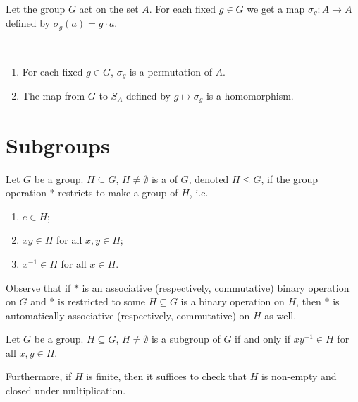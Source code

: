 Let the group $G$ act on the set $A$. For each fixed $g\in G$ we get a map $\sigma_g:A\to A$ defined by $\sigma_g(a)=g\cdot a$.

\begin{proposition} \
\begin{enumerate}[label=(\arabic*)]
\item For each fixed $g\in G$, $\sigma_g$ is a permutation of $A$.
\item The map from $G$ to $S_A$ defined by $g\mapsto\sigma_g$ is a homomorphism.
\end{enumerate}
\end{proposition}

\section{Subgroups}
\begin{definition}[Subgroup]
Let $G$ be a group. $H\subseteq G$, $H\neq\emptyset$ is a  of $G$, denoted $H\le G$, if the group operation $\ast$ restricts to make a group of $H$, i.e.
\begin{enumerate}[label=(\roman*)]
\item $e\in H$;
\item $xy\in H$ for all $x,y\in H$;
\item $x^{-1}\in H$ for all $x\in H$.
\end{enumerate}
\end{definition}

\begin{remark}
Observe that if $\ast$ is an associative (respectively, commutative) binary operation on $G$ and $\ast$ is restricted to some $H\subseteq G$ is a binary operation on $H$, then $\ast$ is automatically associative (respectively, commutative) on $H$ as well.
\end{remark}

\begin{lemma}
Let $G$ be a group. $H\subseteq G$, $H\neq\emptyset$ is a subgroup of $G$ if and only if $xy^{-1}\in H$ for all $x,y\in H$. 

Furthermore, if $H$ is finite, then it suffices to check that $H$ is non-empty and closed under multiplication.
\end{lemma}

